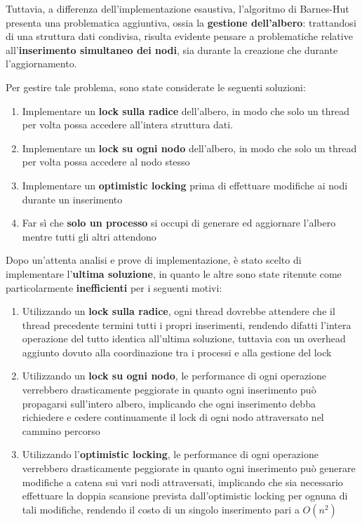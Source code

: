 \documentclass[12pt]{report}
\begin{document}
    Tuttavia, a differenza dell'implementazione esaustiva, l'algoritmo di Barnes-Hut presenta una problematica aggiuntiva, ossia la \textbf{gestione dell'albero}: trattandosi di una struttura dati condivisa, risulta evidente pensare a problematiche relative all'\textbf{inserimento simultaneo dei nodi}, sia durante la creazione che durante l'aggiornamento.

    Per gestire tale problema, sono state considerate le seguenti soluzioni:

    \begin{enumerate}
        \item Implementare un \textbf{lock sulla radice} dell'albero, in modo che solo un thread per volta possa accedere all'intera struttura dati.
                
        \item Implementare un \textbf{lock su ogni nodo} dell'albero, in modo che solo un thread per volta possa accedere al nodo stesso
        
        \item Implementare un \textbf{optimistic locking} prima di effettuare modifiche ai nodi durante un inserimento

        \item Far sì che \textbf{solo un processo} si occupi di generare ed aggiornare l'albero mentre tutti gli altri attendono
    \end{enumerate}

    Dopo un'attenta analisi e prove di implementazione, è stato scelto di implementare l'\textbf{ultima soluzione}, in quanto le altre sono state ritenute come particolarmente \textbf{inefficienti} per i seguenti motivi:

    \begin{enumerate}
        \item Utilizzando un \textbf{lock sulla radice}, ogni thread dovrebbe attendere che il thread precedente termini tutti i propri inserimenti, rendendo difatti l'intera operazione del tutto identica all'ultima soluzione, tuttavia con un overhead aggiunto dovuto alla coordinazione tra i processi e alla gestione del lock
        \item Utilizzando un \textbf{lock su ogni nodo}, le performance di ogni operazione verrebbero drasticamente peggiorate in quanto ogni inserimento può propagarsi sull'intero albero, implicando che ogni inserimento debba richiedere e cedere continuamente il lock di ogni nodo attraversato nel cammino percorso
        \item Utilizzando l'\textbf{optimistic locking}, le performance di ogni operazione verrebbero drasticamente peggiorate in quanto ogni inserimento può generare modifiche a catena sui vari nodi attraversati, implicando che sia necessario effettuare la doppia scansione prevista dall'optimistic locking per ognuna di tali modifiche, rendendo il costo di un singolo inserimento pari a $O(n^2)$  
    \end{enumerate}
\end{document}
